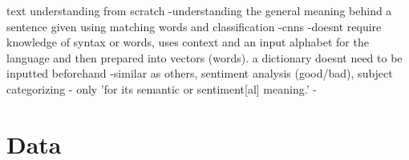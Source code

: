 \documentclass[]{article}
\newcommand{\comment}[1]{}
\begin{document}
{			text understanding from scratch
			-understanding the general meaning behind a sentence given using matching words and classification
			-cnns
			-doesnt require knowledge of syntax or words, uses context and an input alphabet for the language and then prepared into vectors (words). a dictionary doesnt need to be inputted beforehand
			-similar as others, sentiment analysis (good/bad), subject categorizing - only 'for its semantic or sentiment[al] meaning.'
			-
		
		}
		
		
		
	
	\section{Data}
	
		
		\comment{
			using trivia websites to get a training set (where they tell you if the statement is true or false) and then web scraping first page of google result snippets and putting them into a database together
			
			split up dataset into testing and training 
			
			list some examples of the trivia websites you're going to use as well as the google api package for python to get the snippets
	
		}
		
	
	
\end{document}
